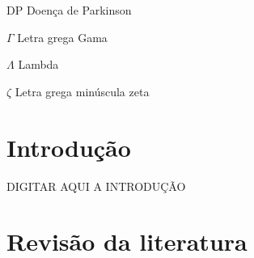 \documentclass[
	12pt,				%
	openany,			%
	oneside,			%
	a4paper,			%
	english,			%
	french,				%
	spanish,			%
	brazil				%
	]{abntex2}
\begin{document}
% 

\listoffigures*
\cleardoublepage

\listoftables*
\cleardoublepage

\begin{siglas}
  \item[DP] Doença de Parkinson
\end{siglas}

\begin{simbolos}
  \item[$ \Gamma $] Letra grega Gama
  \item[$ \Lambda $] Lambda
  \item[$ \zeta $] Letra grega minúscula zeta
\end{simbolos}

\tableofcontents*
\cleardoublepage



\textual

\chapter*[Introdução]{Introdução}

DIGITAR AQUI A INTRODUÇÃO



\chapter{Revisão da literatura}
\end{document}
